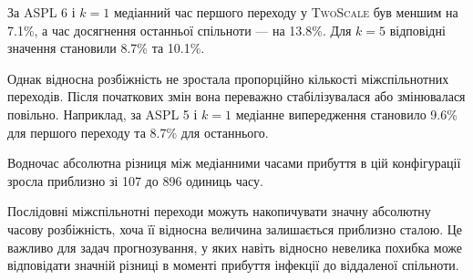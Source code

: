 \documentclass[a4paper,fleqn]{cas-sc}
\newcommand{\TS}{\textup{\textsc{TwoScale}}}
\begin{document}
За ASPL 6 і $k=1$ медіанний
час першого переходу у \TS{}
був меншим на 7.1\%,
а час досягнення останньої спільноти
--- на 13.8\%.
Для $k=5$ відповідні значення
становили 8.7\% та 10.1\%.

Однак відносна розбіжність
не зростала пропорційно кількості
міжспільнотних переходів.
Після початкових змін вона
переважно стабілізувалася
або змінювалася повільно.
Наприклад, за ASPL 5 і $k=1$
медіанне випередження становило
9.6\% для першого переходу
та 8.7\% для останнього.

Водночас абсолютна різниця
між медіанними часами прибуття
в цій конфігурації зросла
приблизно зі 107 до 896
одиниць часу.

Послідовні міжспільнотні
переходи можуть накопичувати
значну абсолютну часову розбіжність,
хоча її відносна величина
залишається приблизно сталою.
Це важливо для задач прогнозування,
у яких навіть відносно невелика
похибка може відповідати значній
різниці в моменті прибуття інфекції
до віддаленої спільноти.
\end{document}
